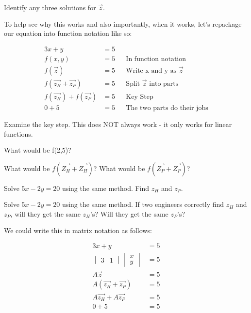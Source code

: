 \begin{blevel}
Identify any three solutions for $\vec{z}$.
\end{blevel}

To help see why this works and also importantly, when it works, let's repackage our equation into function notation like so:

\begin{align*}
3x+y&=5\\
f(x,y)&=5	&&\text{In function notation}\\
f(\vec{z})&=5	&&\text{Write x and y as $\vec{z}$}\\
f(\vec{z_H}+\vec{z_P})&=5	&&\text{Split $\vec{z}$ into parts}\\
f(\vec{z_H})+f(\vec{z_P})&=5 &&\text{Key Step}\\
0+5&=5	&&\text{The two parts do their jobs}
\end{align*}

Examine the key step. This does NOT always work - it only works for linear functions.

\begin{alevel}
What would be f(2,5)?
\end{alevel}

\begin{alevel}
What would be $f(\vec{Z_H}+\vec{Z_H})$? What would be $f(\vec{Z_P}+\vec{Z_P})$?
\end{alevel}

\begin{clevel}
Solve $5x - 2y = 20$ using the same method. Find $z_H$ and $z_P$. 
\end{clevel}

\begin{dlevel}
Solve $5x - 2y = 20$ using the same method. If two engineers correctly find $z_H$ and $z_P$, will they get the same $z_H$'s? Will they get the same $z_P$'s?
\end{dlevel}

We could write this in matrix notation as follows:

\begin{align*}
3x+y&=5\\
\begin{vmatrix}3&1\end{vmatrix} \begin{vmatrix}x \\ y\end{vmatrix} &=5\\
A\vec{z}&=5\\
A(\vec{z_H}+\vec{z_P})&=5\\
A\vec{z_H}+A\vec{z_P}&=5\\
0+5&=5
\end{align*}

